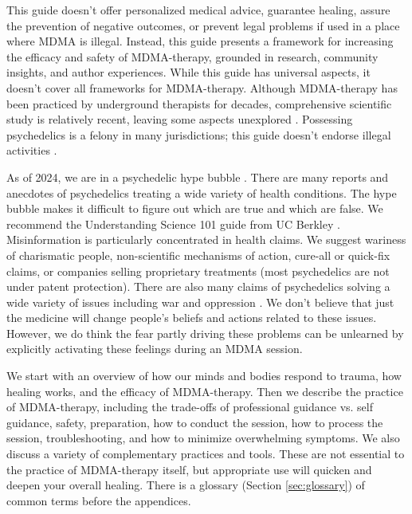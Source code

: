 \documentclass[12pt,letterpaper]{article}
\begin{document}
This guide doesn't offer personalized medical advice, guarantee healing, assure the prevention of negative outcomes, or prevent legal problems if used in a place where MDMA is illegal. Instead, this guide presents a framework for increasing the efficacy and safety of MDMA-therapy, grounded in research, community insights, and author experiences. While this guide has universal aspects, it doesn't cover all frameworks for MDMA-therapy. Although MDMA-therapy has been practiced by underground therapists for decades, comprehensive scientific study is relatively recent, leaving some aspects unexplored \cite{passieHistory}. Possessing psychedelics is a felony in many jurisdictions; this guide doesn't endorse illegal activities \cite{alphaLegalization}.


As of 2024, we are in a psychedelic hype bubble \cite{yaden2022preparing}. There are many reports and anecdotes of psychedelics treating a wide variety of health conditions. The hype bubble makes it difficult to figure out which are true and which are false. We recommend the Understanding Science 101 guide from UC Berkley \cite{understandingScience}. Misinformation is particularly concentrated in health claims. We suggest wariness of charismatic people, non-scientific mechanisms of action, cure-all or quick-fix claims, or companies selling proprietary treatments (most psychedelics are not under patent protection). There are also many claims of psychedelics solving a wide variety of issues including war and oppression \cite{yaden2022preparing}. We don't believe that just the medicine will change people's beliefs and actions related to these issues. However, we do think the fear partly driving these problems can be unlearned by explicitly activating these feelings during an MDMA session.

We start with an overview of how our minds and bodies respond to trauma, how healing works, and the efficacy of MDMA-therapy. Then we describe the practice of MDMA-therapy, including the trade-offs of professional guidance vs. self guidance, safety, preparation, how to conduct the session, how to process the session, troubleshooting, and how to minimize overwhelming symptoms. We also discuss a variety of complementary practices and tools. These are not essential to the practice of MDMA-therapy itself, but appropriate use will quicken and deepen your overall healing. There is a glossary (Section \ref{sec:glossary}) of common terms before the appendices.
\end{document}
